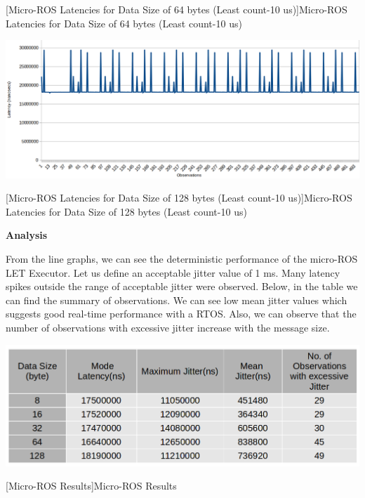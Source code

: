 \documentclass[%
xelatex,
	oneside,		%
	12pt,			%
	parskip=half,	%
	abstracton,
	chapterprefix=true%
    appendixprefix=true]
{scrbook}
\begin{document}
\begin{itemize}
\begin{center}
[Micro-ROS Latencies for Data Size of 64 bytes (Least count-10 us)]{Micro-ROS Latencies for Data Size of 64 bytes (Least count-10 us)}
\label{fig:uros64byte}
\end{center}

\begin{center}
\includegraphics[scale=0.32]{fig/uros128byte.png}

[Micro-ROS Latencies for Data Size of 128 bytes (Least count-10 us)]{Micro-ROS Latencies for Data Size of 128 bytes (Least count-10 us)}
\label{fig:uros128byte}
\end{center}
\end{itemize}
{\bfseries Analysis}


\vspace*{0.5cm}
From the line graphs, we can see the deterministic performance of the micro-ROS LET Executor. Let us define an acceptable jitter value of 1 ms. Many latency spikes outside the range of acceptable jitter were observed. Below, in the table we can find the summary of observations. We can see low mean jitter values which suggests good real-time performance with a RTOS. Also, we can observe that the number of observations with excessive jitter increase with the message size.
\begin{center}
\includegraphics[scale=0.4]{fig/urosfinaldata.png}

[Micro-ROS Results]{Micro-ROS Results}
\label{tab:urosfinaldata}
\end{center}
		
\end{document}
